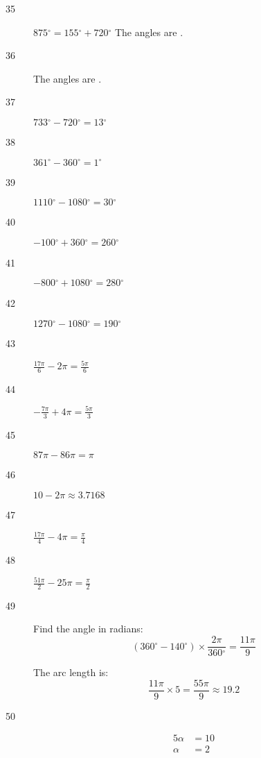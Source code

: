 \documentclass{exam}
\newcommand{\degree}{\ensuremath{^\circ}}
\begin{document}
\begin{description}
      \item[35] $875 \degree = 155 \degree + 720 \degree$
        The angles are .

      \item[36] The angles are .

      \item[37] $733 \degree - 720 \degree = \boxed{ 13 \degree }$

      \item[38] $361 \degree - 360 \degree = \boxed{ 1 \degree }$

      \item[39] $1110 \degree - 1080 \degree = \boxed{ 30 \degree }$

      \item[40] $-100 \degree + 360 \degree = \boxed{ 260 \degree }$

      \item[41] $-800 \degree + 1080 \degree = \boxed{ 280 \degree }$

      \item[42] $1270 \degree - 1080 \degree = \boxed{ 190 \degree }$

      \item[43] $\frac{17 \pi}{6} - 2 \pi = \boxed{ \frac{5 \pi}{6} }$

      \item[44] $- \frac{7 \pi}{3} + 4 \pi = \boxed{ \frac{5 \pi}{3} }$

      \item[45] $87 \pi - 86 \pi = \boxed{ \pi }$

      \item[46] $10 - 2 \pi \approx \boxed{ 3.7168 }$

      \item[47] $\frac{17 \pi}{4} - 4 \pi = \boxed{ \frac{\pi}{4} }$

      \item[48] $\frac{51 \pi}{2} - 25 \pi = \boxed{ \frac{\pi}{2} }$

      \item[49]
        Find the angle in radians:
        \[
          (360 \degree - 140 \degree) \times \frac{2 \pi}{360 \degree} = \frac{11 \pi}{9}
        \]

        The arc length is:
        \[
          \frac{11 \pi}{9} \times 5 = \frac{55 \pi}{9} \approx \boxed{ 19.2 }
        \]

      \item[50]
        \begin{align*}
          5 \alpha & = 10 \\
          \alpha   & = \boxed{ 2 } \\
        \end{align*}


\end{description}
\end{document}
